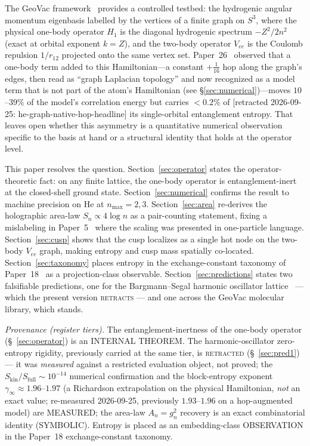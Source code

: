 \documentclass[twocolumn,pra,amsmath,amssymb,superscriptaddress]{revtex4-2}
\begin{document}
The GeoVac framework~\cite{GeoVac_Paper0,GeoVac_Paper7,
GeoVac_Paper14} provides a controlled testbed: the hydrogenic angular
momentum eigenbasis labelled by the vertices of a finite graph on
$S^{3}$, where the physical one-body operator $H_1$ is the diagonal
hydrogenic spectrum $-Z^2/2n^2$ (exact at orbital exponent $k=Z$), and
the two-body operator $V_{ee}$ is the Coulomb repulsion $1/r_{12}$
projected onto the same vertex set.  Paper~26~\cite{GeoVac_Paper26}
observed that a one-body term added to this Hamiltonian---a constant
$+\tfrac{1}{16}$ hop along the graph's edges, then read as ``graph
Laplacian topology'' and now recognized as a model term that is not
part of the atom's Hamiltonian (see \S\ref{sec:numerical})---moves
$10$--$39\%$ of the model's correlation energy but carries $<0.2\%$ of [retracted 2026-09-25: he-graph-native-hop-headline]
its single-orbital entanglement entropy.  That leaves open whether this
asymmetry is a quantitative numerical observation specific to the
basis at hand or a structural identity that holds at the operator
level.

This paper resolves the question.  Section~\ref{sec:operator}
states the operator-theoretic fact: on any finite lattice, the
one-body operator is entanglement-inert at the closed-shell
ground state.  Section~\ref{sec:numerical} confirms the result
to machine precision on He at $n_{\max}=2,3$.
Section~\ref{sec:area} re-derives the holographic area-law
$S_n \propto 4\log n$ as a pair-counting statement, fixing a
mislabeling in Paper~5~\cite{GeoVac_Paper5} where the scaling was
presented in one-particle language.  Section~\ref{sec:cusp}
shows that the cusp localizes as a single hot node on the
two-body $V_{ee}$ graph, making entropy and cusp mass spatially
co-located.  Section~\ref{sec:taxonomy} places entropy in the
exchange-constant taxonomy of Paper~18~\cite{GeoVac_Paper18} as
a projection-class observable.  Section~\ref{sec:predictions}
states two falsifiable predictions, one for the Bargmann--Segal
harmonic oscillator lattice~\cite{GeoVac_Paper24} --- which the
present version \textsc{retracts} --- and one across the GeoVac
molecular library, which stands.

\emph{Provenance (register tiers).}  The entanglement-inertness of the
one-body operator (\S~\ref{sec:operator}) is an INTERNAL THEOREM.  The
harmonic-oscillator zero-entropy rigidity, previously carried at the same
tier, is \textsc{retracted} (\S~\ref{sec:pred1}) --- it was
\emph{measured} against a restricted evaluation object, not proved;
the $S_{\mathrm{kin}}/S_{\mathrm{full}}\sim10^{-14}$ numerical
confirmation and the block-entropy exponent $\gamma_\infty\approx1.96$--$1.97$
(a Richardson extrapolation on the physical Hamiltonian, \emph{not} an
exact value; re-measured 2026-09-25, previously $1.93$--$1.96$ on a
hop-augmented model) are MEASURED;
the area-law $A_n=g_n^2$ recovery is an exact combinatorial identity
(SYMBOLIC).  Entropy is placed as an embedding-class OBSERVATION in the
Paper~18 exchange-constant taxonomy.
\end{document}
